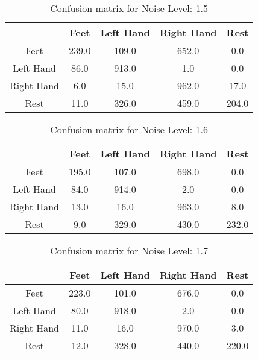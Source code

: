 \begin{table}[!htbp]
    \centering
    \begin{tabular}{|c||c|c|c|c|}
        \hline
		 & Feet & Left Hand & Right Hand & Rest \\
        \hline
        \hline
        Feet & 239.0 & 109.0 & 652.0 & 0.0 \\
        \hline
        Left Hand & 86.0 & 913.0 & 1.0 & 0.0 \\
        \hline
        Right Hand & 6.0 & 15.0 & 962.0 & 17.0 \\
        \hline
        Rest & 11.0 & 326.0 & 459.0 & 204.0 \\
        \hline
    \end{tabular}
    \caption{Confusion matrix for Noise Level: 1.5}
\end{table}

\begin{table}[!htbp]
    \centering
    \begin{tabular}{|c||c|c|c|c|}
        \hline
		 & Feet & Left Hand & Right Hand & Rest \\
        \hline
        \hline
        Feet & 195.0 & 107.0 & 698.0 & 0.0 \\
        \hline
        Left Hand & 84.0 & 914.0 & 2.0 & 0.0 \\
        \hline
        Right Hand & 13.0 & 16.0 & 963.0 & 8.0 \\
        \hline
        Rest & 9.0 & 329.0 & 430.0 & 232.0 \\
        \hline
    \end{tabular}
    \caption{Confusion matrix for Noise Level: 1.6}
\end{table}

\begin{table}[!htbp]
    \centering
    \begin{tabular}{|c||c|c|c|c|}
        \hline
		 & Feet & Left Hand & Right Hand & Rest \\
        \hline
        \hline
        Feet & 223.0 & 101.0 & 676.0 & 0.0 \\
        \hline
        Left Hand & 80.0 & 918.0 & 2.0 & 0.0 \\
        \hline
        Right Hand & 11.0 & 16.0 & 970.0 & 3.0 \\
        \hline
        Rest & 12.0 & 328.0 & 440.0 & 220.0 \\
        \hline
    \end{tabular}
    \caption{Confusion matrix for Noise Level: 1.7}
\end{table}

